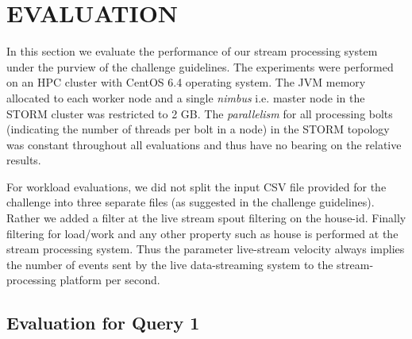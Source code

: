 \documentclass{sig-alternate}
\begin{document}
\section{EVALUATION}
\label{sec:evaluation}


In this section we evaluate the performance of our stream processing system under the purview of the challenge guidelines. The experiments were performed on an  HPC cluster with CentOS 6.4 operating system. The JVM memory allocated to each worker node and a single {\it nimbus} i.e. master node in the STORM cluster was restricted to 2 GB. The {\it parallelism} for all processing bolts (indicating the number of threads per bolt in a node) in the STORM topology was  constant throughout all evaluations and thus have no bearing on the relative results.

For workload evaluations, we did not split the input CSV file provided for the challenge into three separate files (as suggested in the challenge guidelines). Rather we added a filter at the live stream spout filtering on the house-id. Finally filtering for load/work and any other property such as house is performed at the stream processing system. Thus the parameter live-stream velocity always implies the number of events sent by the live data-streaming system to the stream-processing platform per second.

\subsection{Evaluation for Query 1}
\label{sub:eval-query 1}
\end{document}
